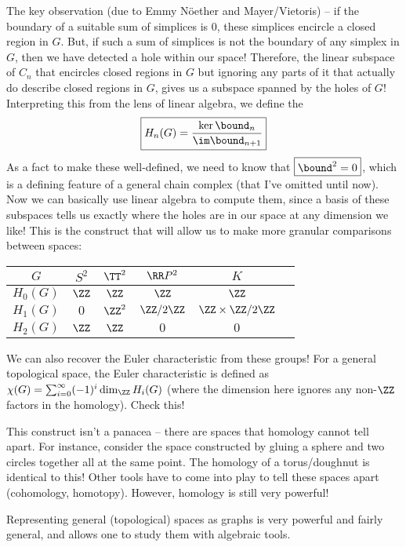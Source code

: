 \documentclass[12pt]{article}
\begin{document}
The key observation (due to Emmy N\"oether and Mayer/Vietoris) -- if the boundary of a suitable sum of simplices is 0,
these simplices encircle a closed region in $G$. But, if such a sum of
simplices is not the boundary of any simplex in $G$, then we have
detected a hole within our space! Therefore, the linear subspace of $C_n$
that encircles closed regions in $G$ but ignoring any parts of it that actually
do describe closed regions in $G$, gives us a subspace spanned by the
holes of $G$! Interpreting this from the lens of linear
algebra, we define the  
\[
\boxed{H_n(G) = \frac{\ker \bound_n}{\im \bound_{n+1}}} 
\] 
As a fact to make these well-defined, we need to know that $\boxed{\bound^2 = 0}$, which
is a defining feature of a general chain complex (that I've omitted until now).   
Now we can basically use linear algebra to compute them, since a basis of
these subspaces tells us exactly where the holes are in our space at any
dimension we like! This is the construct that will allow us to make more
granular comparisons between spaces:  
\begin{center}
    \begin{tabular}{c|ccccc}
      $G$ & $S^2$ & $\TT^2$ & $\RR P^2$ & $K$ \\ \hline
      $H_0(G)$ & $\ZZ$ & $\ZZ$ & $\ZZ$ & $\ZZ$ \\ 
      $H_1(G)$ & $0$ & $\ZZ^2$ & $\ZZ / 2 \ZZ $ & $\ZZ \times \ZZ / 2\ZZ$ \\ 
      $H_2(G)$ & $\ZZ$ & $\ZZ$ & $0$ & $0$ \\ 
    \end{tabular}
\end{center}
\begin{exercise}
We can also recover the Euler characteristic from these groups! For a general
topological space, the Euler characteristic is defined as $\chi(G) =
\sum_{i=0}^\infty (-1)^i \dim_{\ZZ} H_i(G)$ (where the dimension here ignores
any non-$\ZZ$ factors in the homology). Check this!  
\end{exercise}

This construct isn't a panacea -- there are spaces that homology cannot tell
apart. For instance, consider the space constructed by gluing a sphere and two
circles together all at the same point. The homology of a torus/doughnut is
identical to this! Other tools have to come into play to tell these spaces
apart (cohomology, homotopy). However, homology is still very powerful!    
\begin{idea}
  Representing general (topological) spaces as graphs is very
powerful and fairly general, and allows one to study them with algebraic tools.
\end{idea}
\end{document}
